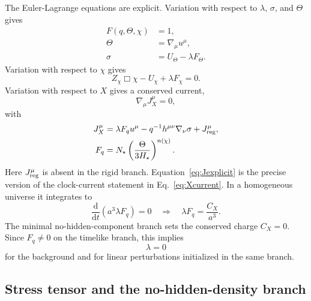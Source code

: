 \documentclass[aps,prd,reprint,nofootinbib,superscriptaddress,longbibliography]{revtex4-2}
\newcommand{\dd}{\mathrm{d}}
\begin{document}
The Euler-Lagrange equations are explicit.  Variation with respect to $\lambda$, $\sigma$, and $\Theta$ gives
\begin{align}
  F(q,\Theta,\chi)&=1,\label{eq:lambdaeq}\\
  \Theta&=\nabla_\mu u^\mu,\label{eq:sigmaeq}\\
  \sigma&=U_\Theta-\lambda F_\Theta .\label{eq:Thetaeq}
\end{align}
Variation with respect to $\chi$ gives
\begin{equation}
  Z_\chi\Box\chi-U_\chi+\lambda F_\chi=0.
  \label{eq:chieq_complete}
\end{equation}
Variation with respect to $X$ gives a conserved current,
\begin{equation}
  \nabla_\mu J_X^\mu=0,
  \label{eq:Jconserve_complete}
\end{equation}
with
\begin{align}
  J_X^\mu&=\lambda F_q u^\mu-q^{-1}h^{\mu\nu}\nabla_\nu\sigma+J_{\rm reg}^\mu,\label{eq:Jexplicit}\\
  F_q&=N_\star\left(\frac{\Theta}{3H_\star}\right)^{n(\chi)} .\nonumber
\end{align}
Here $J_{\rm reg}^\mu$ is absent in the rigid branch.  Equation~\eqref{eq:Jexplicit} is the precise version of the clock-current statement in Eq.~\eqref{eq:Xcurrent}.  In a homogeneous universe it integrates to
\begin{equation}
  \frac{\dd}{\dd t}\left(a^3\lambda F_q\right)=0
  \quad\Rightarrow\quad
  \lambda F_q=\frac{C_X}{a^3}.
  \label{eq:lambdacharge}
\end{equation}
The minimal no-hidden-component branch sets the conserved charge $C_X=0$.  Since $F_q\ne0$ on the timelike branch, this implies
\begin{equation}
  \lambda=0
  \label{eq:lambdazero}
\end{equation}
for the background and for linear perturbations initialized in the same branch.

\subsection{Stress tensor and the no-hidden-density branch}
\label{subsec:stress_tensor_complete}
\end{document}
